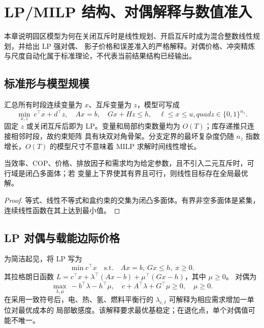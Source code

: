 \section{LP/MILP 结构、对偶解释与数值准入}

\begin{theorynote}
本章说明园区模型为何在关闭互斥时是线性规划、开启互斥时成为混合整数线性规划，并给出 LP 强对偶、
影子价格和误差准入的严格解释。对偶价格、冲突精炼与尺度自动化属于标准理论，不代表当前结果结构已经输出。
\end{theorynote}

\subsection{标准形与模型规模}

汇总所有时段连续变量为 $x$、互斥变量为 $z$，模型可写成
\begin{equation}
 \min_{x,z}\ c^\top x+d^\top z,
 \quad Ax=b,\quad Gx+Hz\le h,
 \quad \ell\le x\le u,quad z\in\{0,1\}^{n_z}.
 \label{eq:ies-milp-standard}
\end{equation}
固定 $z$ 或关闭互斥后即为 LP。变量和局部约束数量均为 $O(T)$；库存递推只连接相邻时段，故约束矩阵
具有块双对角骨架。分支定界的最坏复杂度仍随 $n_z$ 指数增长，$O(T)$ 的模型尺寸不意味着 MILP
求解时间线性增长。

\begin{proposition}[连续模型的凸性]
当效率、COP、价格、排放因子和需求均为给定参数，且不引入二元互斥时，可行域是闭凸多面体；若
变量上下界使其有界且可行，则线性目标存在全局最优解。
\end{proposition}
\begin{proof}
等式、线性不等式和盒约束的交集为闭凸多面体。有界非空多面体是紧集，连续线性函数在其上达到最小值。
\end{proof}

\subsection{LP 对偶与载能边际价格}

为简洁起见，将 LP 写为
\begin{equation}
 \min c^\top x\quad\text{s.t.}\quad Ax=b,\ Gx\le h,\ x\ge0.
\end{equation}
其拉格朗日函数
$L=c^\top x+\lambda^\top(Ax-b)+\mu^\top(Gx-h)$，其中 $\mu\ge0$。
对偶为
\begin{equation}
 \max_{\lambda,\mu}\ -b^\top\lambda-h^\top\mu,
 \quad c+A^\top\lambda+G^\top\mu\ge0,\quad \mu\ge0.
 \label{eq:ies-lp-dual}
\end{equation}
在采用一致符号后，电、热、氢、燃料平衡行的 $\lambda_{c,t}$ 可解释为相应需求增加一单位对最优成本的
局部敏感度。该解释要求最优基稳定；在退化点，单个对偶值可能不唯一。

